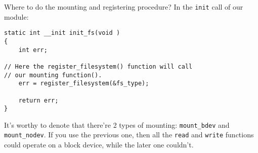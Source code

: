 Where to do the mounting and registering procedure? In the \lstinline{init} call of our module:\\

\begin{lstlisting}
static int __init init_fs(void )
{
    int err;
	
// Here the register_filesystem() function will call
// our mounting function().
    err = register_filesystem(&fs_type);

    return err;
}
\end{lstlisting}

It's worthy to denote that there're 2 types of mounting: \lstinline{mount_bdev} and \lstinline{mount_nodev}. If you use the previous one, then all the \lstinline{read} and \lstinline{write} functions could operate on a block device, while the later one couldn't. 

